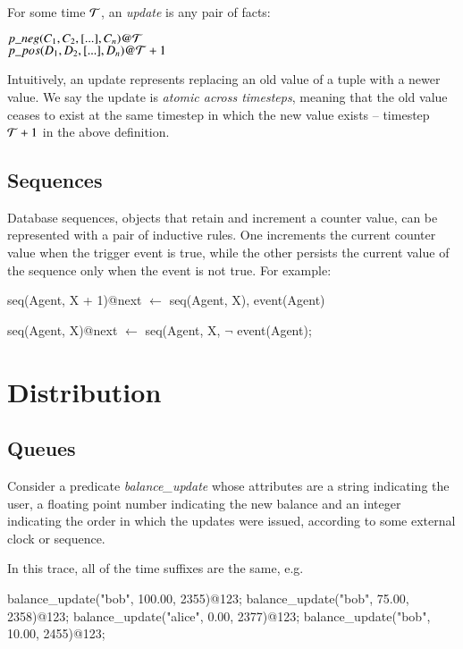 %
For some time $\Tau$, an {\em update} is any pair of facts:

$p\_neg(C_{1},C_{2},[...],C_{n})@\Tau$ \\ $p\_pos(D_{1},D_{2},[...],D_{n})@\Tau+1$
%

Intuitively, an update represents replacing an old value of a tuple with a
newer value.  We say the update is {\em atomic across timesteps}, meaning that
the old value ceases to exist at the same timestep in which the new value
exists -- timestep $\Tau+1$ in the above definition.

\subsection{Sequences}

Database sequences, objects that retain and increment a counter value, can be
represented with a pair of inductive rules.  One increments the current counter value when the
trigger event is true, while the other persists the current value of the sequence only when the event is 
not true.  For example:

\begin{Dedalus}
seq(Agent, X + 1)@next \(\leftarrow\)
  seq(Agent, X), 
  event(Agent) 
  
seq(Agent, X)@next \(\leftarrow\) 
  seq(Agent, X, 
  \(\lnot\) event(Agent);
\end{Dedalus}



\section{Distribution}


\subsection{Queues}

Consider a predicate \emph{balance\_update} whose attributes are a string indicating the user, a floating point number
indicating the new balance and an integer indicating the order in which the updates were issued, according to some 
external clock or sequence.  

In this trace, all of the time suffixes are the same, e.g.

\begin{Dedalus}
balance\_update("bob", 100.00, 2355)@123;
balance\_update("bob", 75.00, 2358)@123;
balance\_update("alice", 0.00, 2377)@123;
balance\_update("bob", 10.00, 2455)@123;
\end{Dedalus}

